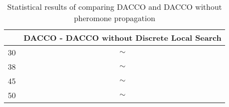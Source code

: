 		\begin{table}[!htdp]
				\begin{center}
					\begin{tabular}{| c | c |}
						\hline
						~ & \multicolumn{1}{p{4cm}|}{\textbf{DACCO - DACCO without Discrete Local Search}} \\ \hline
						30 & $\sim$ \\ \hline
						38 & $\sim$ \\ \hline
						45 & $\sim$ \\ \hline
						50 & $\sim$ \\ \hline
					\end{tabular}
					\caption{Statistical results of comparing DACCO and DACCO without pheromone propagation}
					\label{tab:statistical_comparison_pheromone_propagation}
				\end{center}
		\end{table}
		
		
	